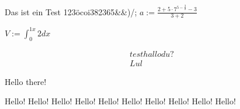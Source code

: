 % 
%
\usepackage{amsmath}
\usepackage{test}


Das ist ein Test 123öcoi382365&&)/;
$a:=\frac{2+5 \cdot{} 7^{5-\frac{3}{2}}-3}{3+2}$

$V := \int_{0}^{1 x}2dx$

\begin{align}
    test hallo du?\\
    Lul
\end{align}

Hello there!

Hello!
Hello!
Hello!
Hello!
Hello!
Hello!
Hello!
Hello!
Hello!
Hello!




